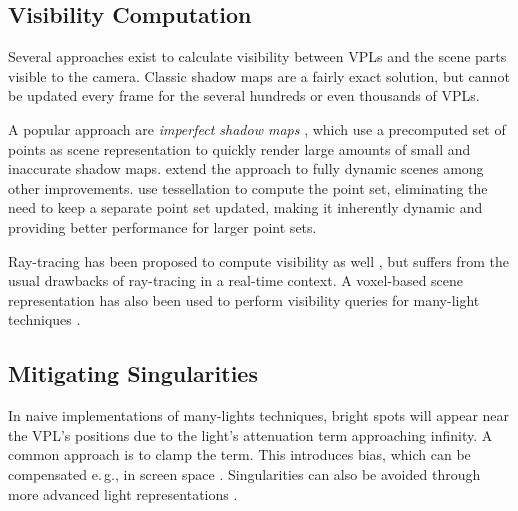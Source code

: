 \subsection{Visibility Computation}
\label{sec:intro:relatedWorkManyLight:visibility}

Several approaches exist to calculate visibility between VPLs and the scene parts visible to the camera. Classic shadow maps are a fairly exact solution, but cannot be updated every frame for the several hundreds or even thousands of VPLs.

A popular approach are \emph{imperfect shadow maps} \citep[ISMs,][]{ritschel2008ism}, which use a precomputed set of points as scene representation to quickly render large amounts of small and inaccurate shadow maps. \citet{ritschel2011ismsViewAdaptive} extend the approach to fully dynamic scenes among other improvements. \citet{barak2013temporally} use tessellation to compute the point set, eliminating the need to keep a separate point set updated, making it inherently dynamic and providing better performance for larger point sets.

Ray-tracing has been proposed to compute visibility as well \citep[e.\,g.,][]{segovia2006bidirectional}, but suffers from the usual drawbacks of ray-tracing in a real-time context. A voxel-based scene representation has also been used to perform visibility queries for many-light techniques \citep{sun2015manylightsSVO}.


\subsection{Mitigating Singularities}
\label{sec:intro:relatedWorkManyLight:singularities}

In naive implementations of many-lights techniques, bright spots will appear near the VPL’s positions due to the light’s attenuation term approaching infinity. A common approach is to clamp the term. This introduces bias, which can be compensated e.\,g., in screen space \citep{novak2011screen}. Singularities can also be avoided through more advanced light representations \citep{tokuyoshi2015vsgl}.


\cleardoublepage
